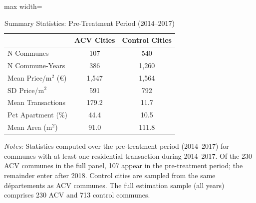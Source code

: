 \begin{table}[htbp]
\centering
\caption{Summary Statistics: Pre-Treatment Period (2014--2017)}
\label{tab:summary}
\begin{adjustbox}{max width=\textwidth}
\begin{tabular}{lcc}
\toprule
 & ACV Cities & Control Cities \\
\midrule
N Communes & 107 & 540 \\
N Commune-Years & 386 & 1,260 \\
Mean Price/m$^2$ (\euro) & 1,547 & 1,564 \\
SD Price/m$^2$ & 591 & 792 \\
Mean Transactions & 179.2 & 11.7 \\
Pct Apartment (\%) & 44.4 & 10.5 \\
Mean Area (m$^2$) & 91.0 & 111.8 \\
\bottomrule
\end{tabular}
\end{adjustbox}

\par \raggedright \small
\textit{Notes:} Statistics computed over the pre-treatment period (2014--2017) for communes with at least one residential transaction during 2014--2017. Of the 230 ACV communes in the full panel, 107 appear in the pre-treatment period; the remainder enter after 2018. Control cities are sampled from the same d\'epartements as ACV communes. The full estimation sample (all years) comprises 230 ACV and 713 control communes.
\end{table}
